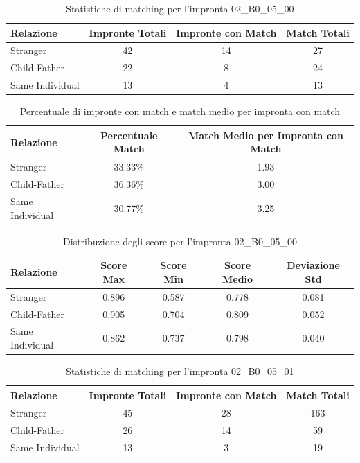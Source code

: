 \begin{table}[htbp]
\centering
\caption{Statistiche di matching per l'impronta 02\_B0\_05\_00}
\label{tab:results_02_B0_05_00}
\begin{tabular}{|l|c|c|c|}
\hline
\textbf{Relazione} & \textbf{Impronte Totali} & \textbf{Impronte con Match} & \textbf{Match Totali} \\
\hline
Stranger & 42 & 14 & 27 \\
\hline
Child-Father & 22 & 8 & 24 \\
\hline
Same Individual & 13 & 4 & 13 \\
\hline
\end{tabular}
\end{table}


\begin{table}[htbp]
\centering
\caption{Percentuale di impronte con match e match medio per impronta con match}
\label{tab:match_percentage_02_B0_05_00}
\begin{tabular}{|l|c|c|}
\hline
\textbf{Relazione} & \textbf{Percentuale Match} & \textbf{Match Medio per Impronta con Match} \\
\hline
Stranger & 33.33\% & 1.93 \\
\hline
Child-Father & 36.36\% & 3.00 \\
\hline
Same Individual & 30.77\% & 3.25 \\
\hline
\end{tabular}
\end{table}


\begin{table}[htbp]
\centering
\caption{Distribuzione degli score per l'impronta 02\_B0\_05\_00}
\label{tab:scores_02_B0_05_00}
\begin{tabular}{|l|c|c|c|c|}
\hline
\textbf{Relazione} & \textbf{Score Max} & \textbf{Score Min} & \textbf{Score Medio} & \textbf{Deviazione Std} \\
\hline
Stranger & 0.896 & 0.587 & 0.778 & 0.081 \\
\hline
Child-Father & 0.905 & 0.704 & 0.809 & 0.052 \\
\hline
Same Individual & 0.862 & 0.737 & 0.798 & 0.040 \\
\hline
\end{tabular}
\end{table}


\begin{table}[htbp]
\centering
\caption{Statistiche di matching per l'impronta 02\_B0\_05\_01}
\label{tab:results_02_B0_05_01}
\begin{tabular}{|l|c|c|c|}
\hline
\textbf{Relazione} & \textbf{Impronte Totali} & \textbf{Impronte con Match} & \textbf{Match Totali} \\
\hline
Stranger & 45 & 28 & 163 \\
\hline
Child-Father & 26 & 14 & 59 \\
\hline
Same Individual & 13 & 3 & 19 \\
\hline
\end{tabular}
\end{table}


